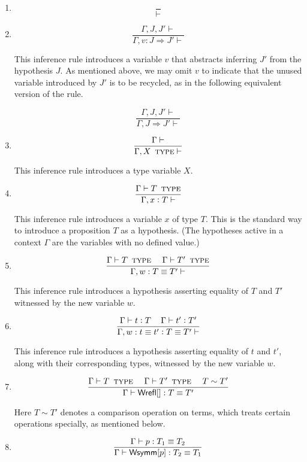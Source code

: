 \documentclass[11pt]{article}
\newcommand{\eqd}{\equiv}
\newcommand\spc{{\,\,\,\,\,\,\,}}
\newcommand{\ccolon}{\vcentcolon}
\newcommand{\Type}{\mathop{\text{ \sc type}}}
\newcommand{\Okay}{\mathop{\text{ \sc okay}}}
\newcommand{\Context}{\vdash\Okay}
\renewcommand{\Context}{\vdash}
\newcommand{\ha}[2]{#1[#2]}
\newcommand{\Wrefl}{{\sf Wrefl}}
\newcommand{\Wsymm}{{\sf Wsymm}}
\begin{document}
\begin{enumerate}

\item
$$\frac{}{\Context}$$

\item
$$\frac{\Gamma,J,J'\Context}{\Gamma,v : J \Rightarrow J' \Context}$$

This inference rule introduces a variable $v$ that abstracts inferring $J'$ from the hypothesis $J$.
As mentioned above, we may omit $v$ to indicate that the unused variable introduced by $J'$ is to be recycled, as 
in the following equivalent version of the rule.

$$\frac{\Gamma,J,J'\Context}{\Gamma,J \Rightarrow J' \Context}$$

\item
$$\frac{\Gamma\Context}{\Gamma, X \Type \Context}$$

This inference rule introduces a type variable $X$.

\item
$$\frac{\Gamma \vdash T \Type}{\Gamma, x \ccolon T \Context}$$

This inference rule introduces a variable $x$ of type $T$.  This is the
standard way to introduce a proposition $T$ as a hypothesis.  (The hypotheses
active in a context $\Gamma$ are the variables with no defined value.)

\item
$$\frac{
  \Gamma \vdash T \Type  
  \spc
  \Gamma \vdash T' \Type }
{\Gamma, w : T \eqd T' \Context}$$

This inference rule introduces a hypothesis asserting equality of $T$ and $T'$ witnessed
by the new variable $w$.

\item
  \[\frac{
  \Gamma \vdash t \ccolon T
  \spc
  \Gamma \vdash t' \ccolon T'
  } {
  \Gamma, w : t \eqd t' \ccolon T \eqd T' \Context}\]

This inference rule introduces a hypothesis asserting equality of $t$ and $t'$, along
with their corresponding types, witnessed by the new variable $w$.

\item 
\[\frac{\Gamma \vdash T \Type \spc \Gamma \vdash T' \Type
  \spc T\sim T'}{
  \Gamma \vdash \ha\Wrefl{}: T\eqd T' 
}
\]

Here $T\sim T'$ denotes a comparison operation on terms, which treats certain
operations specially, as mentioned below.

\item 
$$\frac{\Gamma \vdash p:T_1\eqd T_2 }{\Gamma \vdash \ha\Wsymm{p}:T_2\eqd T_1}$$


\end{enumerate}
\end{document}
